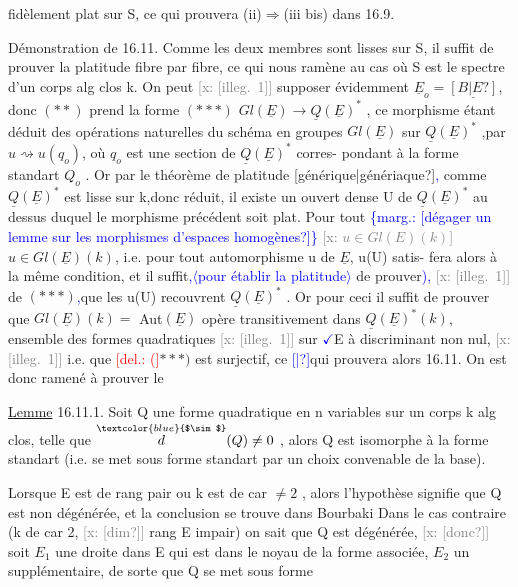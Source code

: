 \documentclass[11pt]{article}
\newcommand{\scanpage}[1]{\par\bigskip\noindent{\small\sffamily[scan #1]}\par}
\newcommand{\mspage}[1]{{\small\sffamily[p.\,#1]}}
\newcommand{\hand}[1]{\textcolor{blue}{#1}}
\newcommand{\inserted}[2][]{\textcolor{blue}{$\langle$#2$\rangle$}}
\newcommand{\margin}[1]{\textcolor{blue}{\{\textsf{marg.:} #1\}}}
\newcommand{\deleted}[1]{\textcolor{red}{[\textsf{del.:} #1]}}
\newcommand{\xout}[1]{\textcolor{gray}{[\textsf{x:} #1]}}
\newcommand{\uline}[1]{\underline{#1}}
\newcommand{\unsure}[1]{[#1?]}
\newcommand{\illegible}[1]{[\textsf{illeg.\ #1}]}
\begin{document}
\clearpage
\scanpage{25/180}
\mspage{7}

fidèlement plat sur S, ce qui prouvera  (ii)$\Longrightarrow$(iii bis) dans  16.9.

Démonstration de 16.11.  Comme les deux membres sont lisses sur S,
il suffit de prouver la platitude fibre par fibre, ce qui nous ramène au
cas où S est le spectre d'un corps alg clos k.  On peut \xout{\illegible{1}} supposer
évidemment $\underline{E}_o=\underline{\unsure{B|E}}$, donc $(**)$ prend la forme
$(***)$   $Gl(\underline{E})\longrightarrow\underline{Q}(\underline{E})^*$ ,
ce morphisme étant déduit des opérations naturelles du schéma en groupes
$Gl(\underline{E})$ sur $\underline{Q}(\underline{E})^*$ ,par $u\rightsquigarrow u(q_o)$, où $q_o$ est une section de $\underline{Q}(\underline{E})^*$ corres-%
pondant à la forme standart $Q_o$ . Or par le théorème de platitude \unsure{générique|génériaque}\hand{,}
comme $\underline{Q}(\underline{E})^*$ est lisse sur k,donc réduit, il existe un ouvert dense U de
$\underline{Q}(\underline{E})^*$ au dessus duquel le morphisme précédent soit plat.  Pour tout \margin{\unsure{dégager un lemme sur les morphismes d'espaces homogènes}}
\xout{$u\in Gl(E)(k)$}$u\in Gl(\underline{E})(k)$, i.e. pour tout automorphisme u de $\underline{E}$, u(U) satis-%
fera alors à la même condition, et il suffit\hand{,}\inserted{pour établir la platitude} de prouver\hand{),} \xout{\illegible{1}}
de $(***)$\hand{,}que les u(U) recouvrent $\underline{Q}(\underline{E})^*$ . Or pour ceci il suffit de prouver
que $Gl(\underline{E})(k)=$ Aut$(\underline{E})$ opère transitivement dans $\underline{Q}(\underline{E})^*(k)$, ensemble des
formes quadratiques \xout{\illegible{1}} sur \hand{$\checkmark$}E à discriminant non nul, \xout{\illegible{1}} i.e. que
\deleted{(}$***)$ est surjectif, ce \hand{\unsure{|}}qui prouvera alors 16.11.  On est donc ramené à
prouver le

\uline{Lemme} 16.11.1.  Soit Q une forme quadratique en n variables sur un corps k
alg clos, telle que $\overset{\hand{$\sim$}}{d}(Q)\neq 0$ , alors Q est isomorphe à la forme standart
(i.e. se met sous forme standart par un choix convenable de la base).

Lorsque E est de rang pair ou k est de car $\neq 2$ , alors l'hypothèse
signifie que Q est non dégénérée, et la conclusion se trouve dans Bourbaki
Dans le cas contraire (k de car 2, \xout{\unsure{dim}} rang E impair)  on sait que Q est
dégénérée, \xout{\unsure{donc}} soit $E_1$ une droite dans E qui est dans le noyau de la
forme associée, $E_2$ un supplémentaire, de sorte que Q se met sous forme
\end{document}
